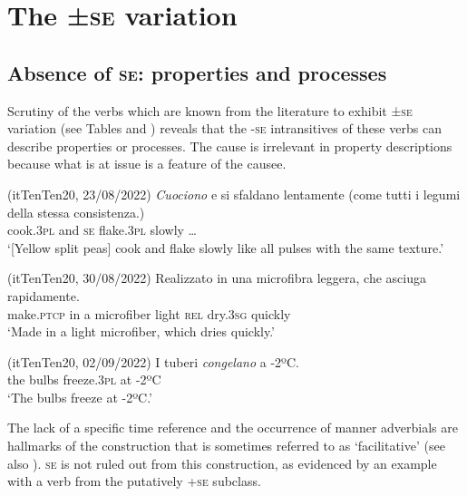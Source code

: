 \documentclass[output=paper,colorlinks,citecolor=brown
]{langscibook}
\begin{document}
\section{The ±\textsc{se} variation}
\label{bentley_section_4}
\subsection{Absence of \textsc{se}: properties and processes}
\label{bentley_section_4.1}
Scrutiny of the verbs which are known from the literature to exhibit ±\textsc{se} variation (see Tables  and ) reveals that the -\textsc{se} intransitives of these verbs can describe properties or processes. The cause is irrelevant in property descriptions because what is at issue is a feature of the causee. 

\hspace*{\fill}(itTenTen20, 23/08/2022)\quad
\ea \label{bentley_example_20}
    \gll \textit{Cuociono} e			si		sfaldano		lentamente (come tutti i legumi della stessa consistenza.)    \\
    cook.3\textsc{pl}		and	\textsc{se}		flake.3\textsc{pl}		slowly {\ldots}\\
    \glt ‘[Yellow split peas] cook and flake slowly like all pulses with the same texture.’
\z

\hspace*{\fill}(itTenTen20, 30/08/2022)\quad
\ea \label{bentley_example_21}
    \gll Realizzato	in una microfibra		leggera,	che			asciuga		rapidamente. \\
    make.\textsc{ptcp}	in	a				microfiber		light				\textsc{rel}		dry.3\textsc{sg}		quickly \\
    \glt ‘Made in a light microfiber, which dries quickly.’
\z

\hspace*{\fill}(itTenTen20, 02/09/2022)\quad
\ea \label{bentley_example_22}
    \gll I tuberi \textit{congelano} a -2ºC.\\
    	the		bulbs		freeze.3\textsc{pl}		at		-2ºC \\
    \glt ‘The bulbs freeze at -2ºC.’
\z


The lack of a specific time reference and the occurrence of manner adverbials are hallmarks of the construction that is sometimes referred to as ‘facilitative’ \citep[147—149]{kemmer1993middle} (see also \cite[25—26]{levin1993english}). \textsc{se} is not ruled out from this construction, as evidenced by an example with a verb from the putatively +\textsc{se} subclass.
\end{document}

